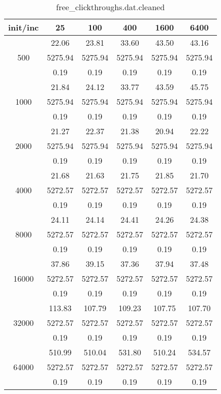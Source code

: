 \begin{table}[th]
\caption{free\_clickthroughs.dat.cleaned}
\label{tab:free_clickthroughs.dat.cleaned}
\centering
\begin{tabular}{|c||c|c|c|c|c|}
\hline
init/inc & 25 & 100 & 400 & 1600 & 6400 \\ \hline \hline
  & 22.06 & 23.81 & 33.60 & 43.50 & 43.16\\ 
500  & 5275.94 & 5275.94 & 5275.94 & 5275.94 & 5275.94\\ 
  & 0.19 & 0.19 & 0.19 & 0.19 & 0.19\\ \hline 
  & 21.84 & 24.12 & 33.77 & 43.59 & 45.75\\ 
1000  & 5275.94 & 5275.94 & 5275.94 & 5275.94 & 5275.94\\ 
  & 0.19 & 0.19 & 0.19 & 0.19 & 0.19\\ \hline 
  & 21.27 & 22.37 & 21.38 & 20.94 & 22.22\\ 
2000  & 5275.94 & 5275.94 & 5275.94 & 5275.94 & 5275.94\\ 
  & 0.19 & 0.19 & 0.19 & 0.19 & 0.19\\ \hline 
  & 21.68 & 21.63 & 21.75 & 21.85 & 21.70\\ 
4000  & 5272.57 & 5272.57 & 5272.57 & 5272.57 & 5272.57\\ 
  & 0.19 & 0.19 & 0.19 & 0.19 & 0.19\\ \hline 
  & 24.11 & 24.14 & 24.41 & 24.26 & 24.38\\ 
8000  & 5272.57 & 5272.57 & 5272.57 & 5272.57 & 5272.57\\ 
  & 0.19 & 0.19 & 0.19 & 0.19 & 0.19\\ \hline 
  & 37.86 & 39.15 & 37.36 & 37.94 & 37.48\\ 
16000  & 5272.57 & 5272.57 & 5272.57 & 5272.57 & 5272.57\\ 
  & 0.19 & 0.19 & 0.19 & 0.19 & 0.19\\ \hline 
  & 113.83 & 107.79 & 109.23 & 107.75 & 107.70\\ 
32000  & 5272.57 & 5272.57 & 5272.57 & 5272.57 & 5272.57\\ 
  & 0.19 & 0.19 & 0.19 & 0.19 & 0.19\\ \hline 
  & 510.99 & 510.04 & 531.80 & 510.24 & 534.57\\ 
64000  & 5272.57 & 5272.57 & 5272.57 & 5272.57 & 5272.57\\ 
  & 0.19 & 0.19 & 0.19 & 0.19 & 0.19\\ \hline 
\end{tabular}
\end{table}

